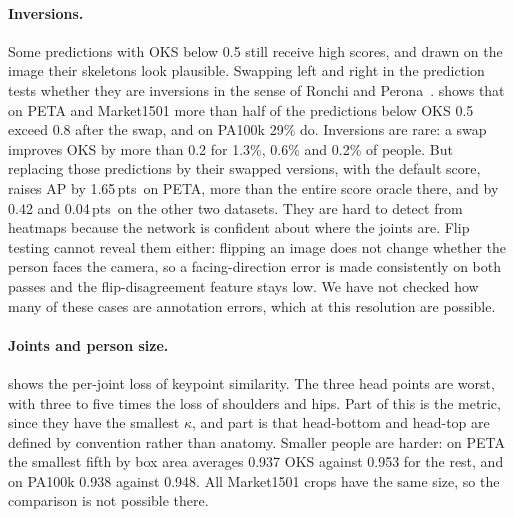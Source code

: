\documentclass[10pt,twocolumn,letterpaper]{article}
\newcommand{\pts}{\,pts}
\begin{document}
\paragraph{Inversions.} Some predictions with OKS below 0.5 still receive high scores, and drawn on the image their skeletons look plausible. Swapping left and right in the prediction tests whether they are inversions in the sense of Ronchi and Perona~\cite{ronchi}.  shows that on PETA and Market1501 more than half of the predictions below OKS 0.5 exceed 0.8 after the swap, and on PA100k 29\% do. Inversions are rare: a swap improves OKS by more than 0.2 for 1.3\%, 0.6\% and 0.2\% of people. But replacing those predictions by their swapped versions, with the default score, raises AP by 1.65\pts\ on PETA, more than the entire score oracle there, and by 0.42 and 0.04\pts\ on the other two datasets. They are hard to detect from heatmaps because the network is confident about where the joints are. Flip testing cannot reveal them either: flipping an image does not change whether the person faces the camera, so a facing-direction error is made consistently on both passes and the flip-disagreement feature stays low. We have not checked how many of these cases are annotation errors, which at this resolution are possible.

\begin{table}[t]
\centering\small
\setlength{\tabcolsep}{3.5pt}
\caption{Left--right inversions of the held-out huge models and the AP they cost.}
\label{tab:swap}
\end{table}

\paragraph{Joints and person size.}  shows the per-joint loss of keypoint similarity. The three head points are worst, with three to five times the loss of shoulders and hips. Part of this is the metric, since they have the smallest $\kappa$, and part is that head-bottom and head-top are defined by convention rather than anatomy. Smaller people are harder: on PETA the smallest fifth by box area averages 0.937 OKS against 0.953 for the rest, and on PA100k 0.938 against 0.948. All Market1501 crops have the same size, so the comparison is not possible there.
\end{document}

